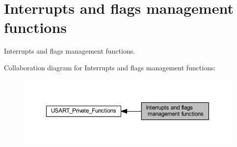 \hypertarget{group___u_s_a_r_t___group9}{}\section{Interrupts and flags management functions}
\label{group___u_s_a_r_t___group9}


Interrupts and flags management functions.  


Collaboration diagram for Interrupts and flags management functions\+:\nopagebreak
\begin{figure}[H]
\begin{center}
\leavevmode
\includegraphics[width=350pt]{group___u_s_a_r_t___group9}
\end{center}
\end{figure}
